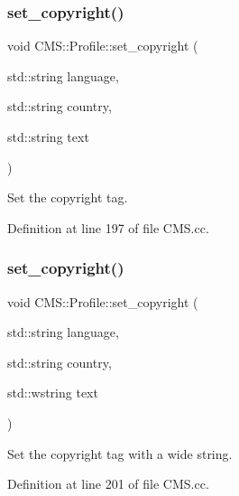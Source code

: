\subsubsection{\texorpdfstring{set\+\_\+copyright()}{set\_copyright()}\hspace{0.1cm}{\footnotesize\ttfamily [1/2]}}
{\footnotesize\ttfamily void C\+M\+S\+::\+Profile\+::set\+\_\+copyright (\begin{DoxyParamCaption}\item[{std\+::string}]{language,  }\item[{std\+::string}]{country,  }\item[{std\+::string}]{text }\end{DoxyParamCaption})}



Set the copyright tag. 



Definition at line 197 of file C\+M\+S.\+cc.

\mbox{\label{class_c_m_s_1_1_profile_ad88fcfb7bd3adae8f8c9d4c9143f355f}} 
\subsubsection{\texorpdfstring{set\+\_\+copyright()}{set\_copyright()}\hspace{0.1cm}{\footnotesize\ttfamily [2/2]}}
{\footnotesize\ttfamily void C\+M\+S\+::\+Profile\+::set\+\_\+copyright (\begin{DoxyParamCaption}\item[{std\+::string}]{language,  }\item[{std\+::string}]{country,  }\item[{std\+::wstring}]{text }\end{DoxyParamCaption})}



Set the copyright tag with a wide string. 



Definition at line 201 of file C\+M\+S.\+cc.

\mbox{\label{class_c_m_s_1_1_profile_a636e6a2629c4e806a3eb8f2b2a7dc340}} 

